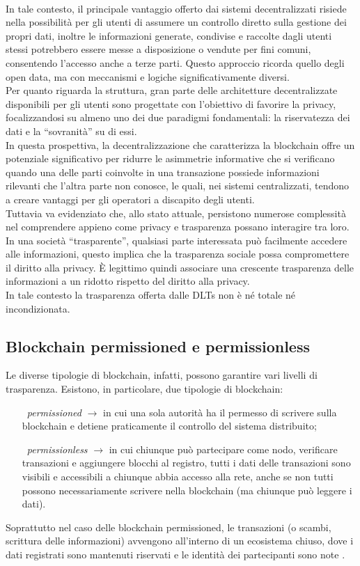 \\In tale contesto, il principale vantaggio offerto dai sistemi decentralizzati risiede nella possibilità per gli utenti di assumere un controllo diretto sulla gestione dei propri dati, inoltre le informazioni generate, condivise e raccolte dagli utenti stessi potrebbero essere messe a disposizione o vendute per fini comuni,
consentendo l'accesso anche a terze parti. Questo approccio ricorda quello degli open data, ma con meccanismi e logiche significativamente diversi.
\\Per quanto riguarda la struttura, gran parte delle architetture decentralizzate disponibili per gli utenti sono progettate con l'obiettivo di favorire la privacy, focalizzandosi su almeno uno dei due paradigmi fondamentali: la riservatezza dei dati e la “sovranità” su di essi.
\\In questa prospettiva, la decentralizzazione che caratterizza la blockchain offre un potenziale significativo per ridurre le asimmetrie informative che si verificano quando una delle parti coinvolte in una transazione possiede informazioni rilevanti che l'altra parte non conosce, le quali, nei sistemi centralizzati, tendono a creare vantaggi per gli operatori a discapito degli utenti.
\\Tuttavia va evidenziato che, allo stato attuale, persistono numerose complessità nel comprendere appieno come privacy e trasparenza possano interagire tra loro.
\\In una società “trasparente”, qualsiasi parte interessata può facilmente accedere alle informazioni, questo implica che la trasparenza sociale possa compromettere il diritto alla privacy. \`E legittimo quindi associare una crescente trasparenza delle informazioni a un ridotto rispetto del diritto alla privacy.
\\In tale contesto la trasparenza offerta dalle DLTs non è né totale né incondizionata. 

\subsection{Blockchain permissioned e permissionless}
Le diverse tipologie di blockchain, infatti, possono garantire vari livelli di trasparenza. Esistono, in particolare, due tipologie di blockchain: 
\begin{itemize}
    \item[\textbullet\ \textit{permissioned} $\rightarrow$] in cui una sola autorità ha il permesso di scrivere sulla blockchain e detiene praticamente il controllo del sistema distribuito;
    \item[\textbullet\ \textit{permissionless} $\rightarrow$] in cui chiunque può partecipare come nodo, verificare transazioni e aggiungere blocchi al registro, tutti i dati delle transazioni sono visibili e accessibili a chiunque abbia accesso alla rete, anche se non tutti possono necessariamente scrivere nella blockchain (ma chiunque può leggere i dati).
\end{itemize}
Soprattutto nel caso delle blockchain permissioned, le transazioni (o scambi, scrittura delle informazioni) avvengono all’interno di un ecosistema chiuso, dove i dati registrati sono mantenuti riservati e le identità dei partecipanti sono note \cite{Blockchain_tecnologia_e_applicazioni_per_il_business}.
